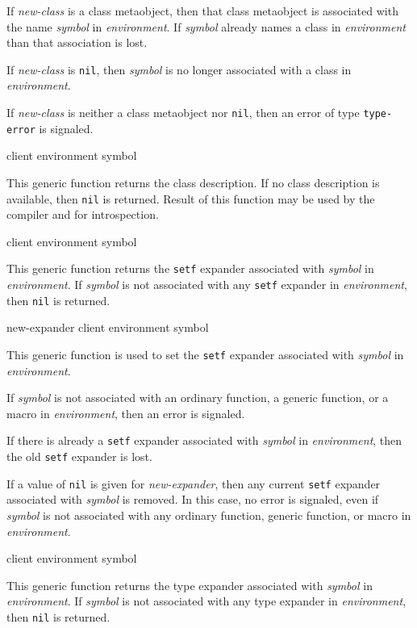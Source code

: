 If \textit{new-class} is a class metaobject, then that class
metaobject is associated with the name \textit{symbol} in
\textit{environment}.  If \textit{symbol} already names a class in
\textit{environment} than that association is lost.

If \textit{new-class} is \texttt{nil}, then \textit{symbol} is no
longer associated with a class in \textit{environment}.

If \textit{new-class} is neither a class metaobject nor \texttt{nil},
then an error of type \texttt{type-error} is signaled.

 {client environment symbol}

This generic function returns the class description. If no class description
is available, then \texttt{nil} is returned. Result of this function may be
used by the compiler and for introspection.

 {client environment symbol}

This generic function returns the \texttt{setf} expander associated
with \textit{symbol} in \textit{environment}.  If \textit{symbol} is
not associated with any \texttt{setf} expander in
\textit{environment}, then \texttt{nil} is returned.

 {new-expander client environment symbol}

This generic function is used to set the \texttt{setf} expander
associated with \textit{symbol} in \textit{environment}.

If \textit{symbol} is not associated with an ordinary function, a
generic function, or a macro in \textit{environment}, then an error is
signaled.

If there is already a \texttt{setf} expander associated with
\textit{symbol} in \textit{environment}, then the old \texttt{setf}
expander is lost.

If a value of \texttt{nil} is given for \textit{new-expander}, then
any current \texttt{setf} expander associated with \textit{symbol} is
removed.  In this case, no error is signaled, even if \textit{symbol}
is not associated with any ordinary function, generic function, or
macro in \textit{environment}.

 {client environment symbol}

This generic function returns the type expander associated with
\textit{symbol} in \textit{environment}.  If \textit{symbol} is not
associated with any type expander in \textit{environment}, then
\texttt{nil} is returned.

